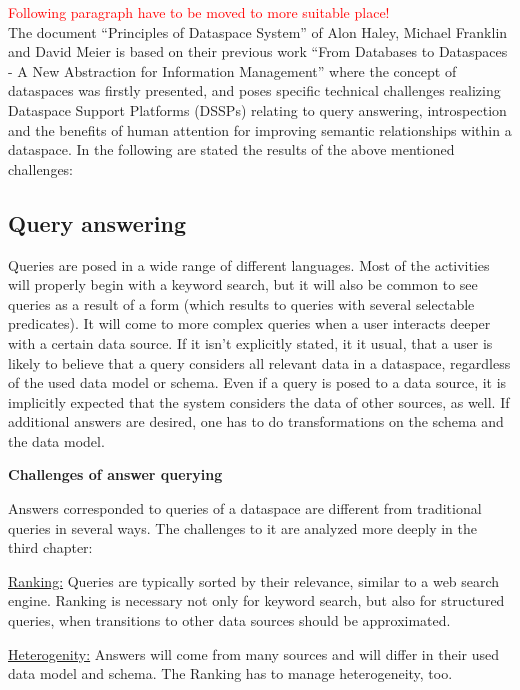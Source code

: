 
\textcolor{red}{Following paragraph have to be moved to more suitable place!}\\
The document ``Principles of Dataspace System'' of Alon Haley, Michael Franklin and David Meier\cite{Halevy:2006:PDS:1142351.1142352} is based on their previous work ``From Databases to Dataspaces - A New Abstraction for Information Management''\cite{Franklin:2005:DDN:1107499.1107502} where the concept of dataspaces was firstly presented, and poses specific technical challenges realizing Dataspace Support Platforms (DSSPs) relating to query answering, introspection and the benefits of human attention for improving semantic relationships within a dataspace.  
In the following are stated the results of the above mentioned challenges:


\subsection{Query answering}

Queries are posed in a wide range of different languages. Most of the activities will properly begin with a keyword search, but it will also be common to see queries as a result of a form (which results to queries with several selectable predicates). It will come to more complex queries when a user interacts deeper with a certain data source. If it isn't explicitly stated, it it usual, that a user is likely to believe that a query considers all relevant data in a dataspace, regardless of the used data model or schema. Even if a query is posed to a data source, it is implicitly expected that the system considers the data of other sources, as well. If additional answers are desired, one has to do transformations on the schema and the data model.

\textbf{Challenges of answer querying}

Answers corresponded to queries of a dataspace are different from traditional queries in several ways. The challenges to it are analyzed more deeply in the third chapter:

\uline{Ranking:} Queries are typically sorted by their relevance, similar to a web search engine. Ranking is necessary not only for keyword search, but also for structured queries, when transitions to other data sources should be approximated.  

\uline{Heterogenity:} Answers will come from many sources and will differ in their used data model and schema. The Ranking has to manage heterogeneity, too.

